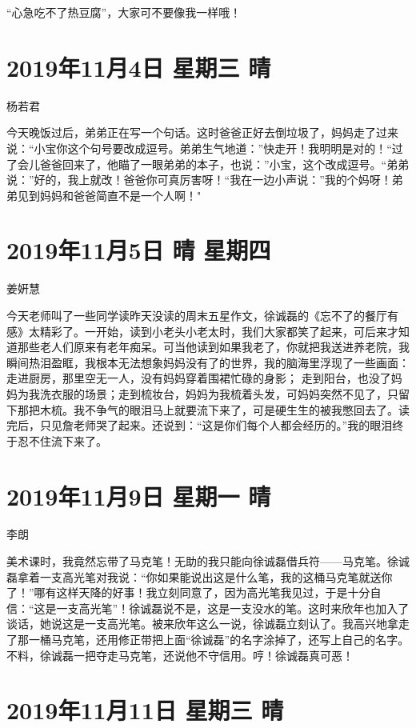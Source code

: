 ``心急吃不了热豆腐''，大家可不要像我一样哦！

\section{2019年11月4日 星期三 晴}

杨若君

今天晚饭过后，弟弟正在写一个句话。这时爸爸正好去倒垃圾了，妈妈走了过来说：``小宝你这个句号要改成逗号。弟弟生气地道：''快走开！我明明是对的！``过了会儿爸爸回来了，他瞄了一眼弟弟的本子，也说：''小宝，这个改成逗号。``弟弟说：''好的，我上就改！爸爸你可真厉害呀！``我在一边小声说：''我的个妈呀！弟弟见到妈妈和爸爸简直不是一个人啊！"

\section{2019年11月5日 晴 星期四}

姜姸慧

今天老师叫了一些同学读昨天没读的周末五星作文，徐诚磊的《忘不了的餐厅有感》太精彩了。一开始，读到小老头小老太时，我们大家都笑了起来，可后来才知道那些老人们原来有老年痴呆。可当他读到如果我老了，你就把我送进养老院，我瞬间热泪盈眶，我根本无法想象妈妈没有了的世界，我的脑海里浮现了一些画面：走进厨房，那里空无一人，没有妈妈穿着围裙忙碌的身影；
走到阳台，也没了妈妈为我洗衣服的场景；走到梳妆台，妈妈为我梳着头发，可妈妈突然不见了，只留下那把木梳。我不争气的眼泪马上就要流下来了，可是硬生生的被我憋回去了。读完后，只见詹老师哭了起来。还说到：``这是你们每个人都会经历的。''我的眼泪终于忍不住流下来了。

\section{2019年11月9日 星期一 晴}

李朗

美术课时，我竟然忘带了马克笔！无助的我只能向徐诚磊借兵符------马克笔。徐诚磊拿着一支高光笔对我说：``你如果能说出这是什么笔，我的这桶马克笔就送你了！''哪有这样天降的好事！我立刻同意了，因为高光笔我见过，于是十分自信：``这是一支高光笔''！徐诚磊说不是，这是一支没水的笔。这时来欣年也加入了谈话，她说这是一支高光笔。被来欣年这么一说，徐诚磊立刻认了。我高兴地拿走了那一桶马克笔，还用修正带把上面``徐诚磊''的名字涂掉了，还写上自己的名字。不料，徐诚磊一把夺走马克笔，还说他不守信用。哼！徐诚磊真可恶！

\section{2019年11月11日 星期三 晴}

